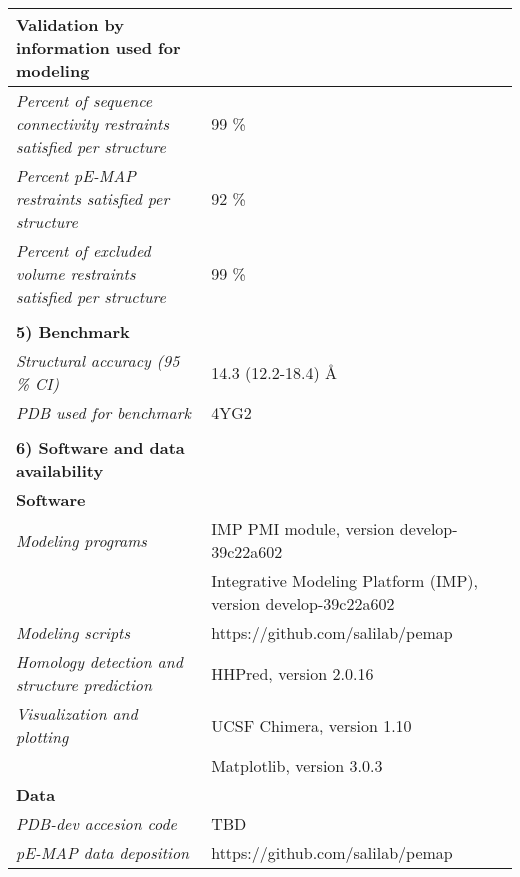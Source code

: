\documentclass[8pt,a4paper]{article}
\begin{document}
\begin{longtable}{ p{} | p{} }
  \textbf{Validation by information used for modeling} & \\
  \hline
          \textit{Percent of sequence connectivity restraints satisfied per structure} & 99 \%\\
                \textit{Percent pE-MAP restraints satisfied per structure} & 92 \%\\
                \textit{Percent of excluded volume restraints satisfied per structure} & 99 \%\\
          &  \\
  
  \textbf{5) Benchmark} & \\
  \hline
          \textit{Structural accuracy (95 \% CI)} & 14.3 (12.2-18.4) \AA\\
                \textit{PDB used for benchmark} & 4YG2\\
          
   &  \\
  \normalsize{\textbf{6) Software and data availability}} & \\
    \hline
   \textbf{Software} & \\
   \hline
             \textit{Modeling programs} & IMP PMI module, version develop-39c22a602\\
             & Integrative Modeling Platform (IMP), version develop-39c22a602 \\
                  \textit{Modeling scripts} & https://github.com/salilab/pemap\\
                  \textit{Homology detection and structure prediction} & HHPred, version 2.0.16\\
                  \textit{Visualization and plotting} & UCSF Chimera, version 1.10\\
             & Matplotlib, version 3.0.3  \\
          \hline

  \textbf{Data} & \\
    \hline
            \textit{PDB-dev accesion code} & TBD\\
                  \textit{pE-MAP data deposition} & https://github.com/salilab/pemap\\
          \hline
  
\end{longtable}
\end{document}
